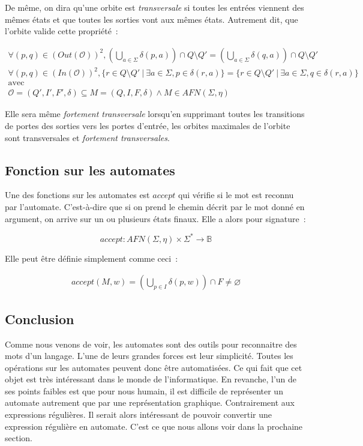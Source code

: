 \begin{definition}
    De même, on dira qu'une orbite est \textit{transversale} si toutes les
    entrées viennent des mêmes états et que toutes les sorties vont aux mêmes
    états. Autrement dit, que l'orbite valide cette propriété~:

    \begin{gather*}
        \forall (p, q) \in (Out(\mathcal{O}))^2, (\bigcup_{a \in \Sigma} \delta(p, a)) \cap Q \setminus Q' = (\bigcup_{a \in \Sigma} \delta(q, a)) \cap Q \setminus Q' \\
        \forall (p, q) \in (In(\mathcal{O}))^2, \{r \in Q \setminus Q' ~|~ \exists a \in \Sigma, p \in \delta(r, a)\} = \{r \in Q \setminus Q' ~|~ \exists a \in \Sigma, q \in \delta(r, a)\} \\
        \text{avec} \\
        \mathcal{O} = (Q', I', F', \delta) \subseteq M = (Q, I, F, \delta) \land M \in AFN(\Sigma, \eta)
    \end{gather*}

    \noindent Elle sera même \textit{fortement transversale} lorsqu'en
    supprimant toutes les transitions de portes des sorties vers les portes
    d'entrée, les orbites maximales de l'orbite sont transversales et
    \textit{fortement transversales}.
\end{definition}

\subsection{Fonction sur les automates}

Une des fonctions sur les automates est \(accept\) qui vérifie si le mot est
reconnu par l'automate. C'est-à-dire que si on prend le chemin décrit par le
mot donné en argument, on arrive sur un ou plusieurs états finaux. Elle a alors
pour signature~:

\[
    accept: AFN(\Sigma, \eta) \times \Sigma^* \to \mathbb{B}
\]

Elle peut être définie simplement comme ceci~:

\begin{align*}
    accept(M, w) = (\bigcup_{p \in I} \delta(p, w)) \cap F \neq \varnothing
\end{align*}

\subsection{Conclusion}

Comme nous venons de voir, les automates sont des outils pour reconnaitre des
mots d'un langage. L'une de leurs grandes forces est leur simplicité. Toutes
les opérations sur les automates peuvent donc être automatisées. Ce qui fait
que cet objet est très intéressant dans le monde de l'informatique. En
revanche, l'un de ses points faibles est que pour nous humain, il est difficile
de représenter un automate autrement que par une représentation graphique.
Contrairement aux expressions régulières. Il serait alors intéressant de
pouvoir convertir une expression régulière en automate. C'est ce que nous
allons voir dans la prochaine section.

